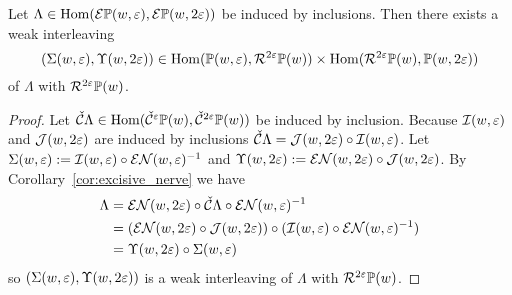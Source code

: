 
\begin{lemma}\label{lem:weak_rips_left}
  Let $\Lambda\in\Hom(\ext{\PP(w,\e)}, \ext{\PP(w,2\e)})$ be induced by inclusions.
  Then there exists a weak interleaving
  \[ (\Sigma(w,\e), \Upsilon(w,2\e))\in \Hom(\PP(w,\e), \rips^{2\e}\PP(w))\times \Hom(\rips^{2\e}\PP(w),\PP(w,2\e))\]
  of $\Lambda$ with $\rips^{2\e}\PP(w)$.
\end{lemma}
\begin{proof}
  Let $\cech\Lambda\in\Hom(\cech^\e\PP(w),\cech^{2\e}\PP(w))$ be induced by inclusion.
  Because $\I(w,\e)$ and $\J(w,2\e)$ are induced by inclusions $\cech\Lambda = \J(w,2\e)\circ \I(w,\e)$.
  Let $\Sigma(w,\e) := \I(w,\e)\circ \E\N(w,\e)^{-1}$ and $\Upsilon(w,2\e) := \E\N(w,2\e)\circ \J(w,2\e)$.
  By Corollary~\ref{cor:excisive_nerve} we have
  \begin{align*}
    \Lambda &= \E\N(w,2\e)\circ \cech\Lambda\circ \E\N(w,\e)^{-1}\\
      &= (\E\N(w,2\e)\circ \J(w,2\e))\circ (\I(w,\e)\circ \E\N(w,\e)^{-1})\\
      &= \Upsilon(w, 2\e)\circ \Sigma(w,\e)
  \end{align*}
  so $(\Sigma(w,\e), \Upsilon(w,2\e))$ is a weak interleaving of $\Lambda$ with $\rips^{2\e}\PP(w)$.
\end{proof}

